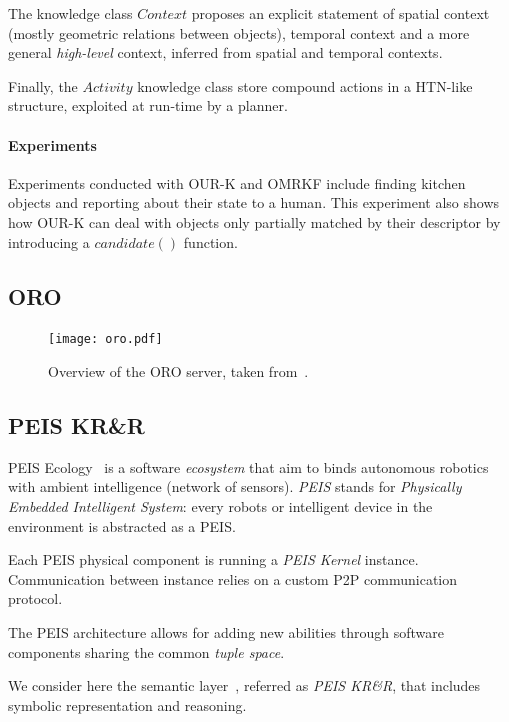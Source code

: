 \documentclass[a4paper, twocolumn]{article}
\begin{document}
The knowledge class $Context$ proposes an explicit statement of spatial context
(mostly geometric relations between objects), temporal context and a more
general \emph{high-level} context, inferred from spatial and temporal contexts.

Finally, the $Activity$ knowledge class store compound actions in a HTN-like
structure, exploited at run-time by a planner.


\paragraph{Experiments} Experiments conducted with OUR-K and OMRKF include
finding kitchen objects and reporting about their state to a human.  This
experiment also shows how OUR-K can deal with objects only partially matched by
their descriptor by introducing a $candidate()$ function.

\subsection{ORO}
\label{sect|oro}

\begin{figure}
    \centering
    \texttt{[image: oro.pdf]}

    \caption{Overview of the ORO server, taken from~\cite{Lemaignan2012}.}

    \label{fig|oro}
\end{figure}

\subsection{PEIS KR\&R}
\label{sect|peis-ecology}

{\sc PEIS Ecology}~\cite{Saffiotti2005} is a software \emph{ecosystem} that aim
to binds autonomous robotics with ambient intelligence (network of sensors).
\emph{PEIS} stands for \emph{Physically Embedded Intelligent System}: every
robots or intelligent device in the environment is abstracted as a PEIS.

Each PEIS physical component is running a \emph{PEIS Kernel} instance.
Communication between instance relies on a custom P2P communication protocol.

The PEIS architecture allows for adding new abilities through software
components sharing the common \emph{tuple space}.

We consider here the semantic layer~\cite{Daoutis2009}, referred as \emph{PEIS
KR\&R}, that includes symbolic representation and reasoning.
\end{document}
